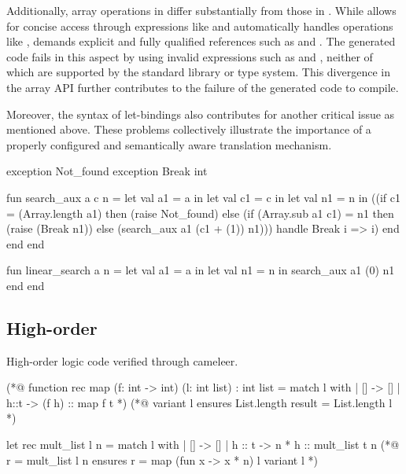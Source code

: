 Additionally, array operations in \cml differ substantially from those in \ocaml. While \ocaml allows for concise access through 
expressions like  and automatically handles operations like , \cml demands explicit 
and fully qualified references such as  and . The generated code fails 
in this aspect by using invalid expressions such as  and , neither of which are 
supported by the \cml standard library or type system. This divergence in the array API further contributes to the failure of 
the generated code to compile.

Moreover, the syntax of let-bindings also contributes for another critical issue as mentioned above. These problems collectively 
illustrate the importance of a properly configured and semantically aware translation mechanism.

\begin{cakeml}

exception Not_found
exception Break int

fun search_aux a c n = let val a1 = a in
  let val c1 = c in
  let val n1 = n in
  ((if c1 = (Array.length a1) then (raise Not_found) 
    else (if (Array.sub  a1 c1) = n1 then (raise (Break n1)) 
          else (search_aux a1 (c1 + (1)) n1)))
  handle Break i => i)
  end end end

fun linear_search a n =
  let val a1 = a in let val n1 = n in search_aux a1 (0) n1 
  end end

\end{cakeml}

\subsection{High-order}

High-order logic code verified through cameleer.

\begin{gospell}
    (*@ function rec map (f: int -> int) (l: int list) : int list = 
            match l with
            | [] -> []
            | h::t -> (f h) :: map f t *)
    (*@ variant l
            ensures List.length result = List.length l *)

    let rec mult_list l n =
        match l with
        | [] -> []
        | h :: t -> n * h :: mult_list t n
    (*@ r = mult_list l n
            ensures r = map (fun x -> x * n) l
            variant l *)
\end{gospell}

